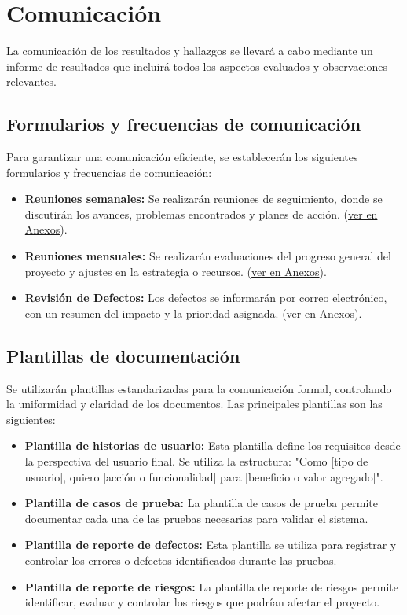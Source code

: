 \documentclass[stu, 12pt, letterpaper, donotrepeattitle, floatsintext, natbib]{apa7}
\begin{document}
\section{\large Comunicación}

\noindent La comunicación de los resultados y hallazgos se llevará a cabo mediante un informe de resultados que incluirá todos los aspectos evaluados y observaciones relevantes.

    \subsection{Formularios y frecuencias de comunicación}
        \noindent Para garantizar una comunicación eficiente, se establecerán los siguientes formularios y frecuencias de comunicación:
        \begin{itemize}
            \item \textbf{Reuniones semanales:} Se realizarán reuniones de seguimiento, donde se discutirán los avances, problemas encontrados y planes de acción. (\hyperref[]{ver en Anexos}).
            \item \textbf{Reuniones mensuales:} Se realizarán evaluaciones del progreso general del proyecto y ajustes en la estrategia o recursos. (\hyperref[]{ver en Anexos}).
            \item \textbf{Revisión de Defectos:} Los defectos se informarán por correo electrónico, con un resumen del impacto y la prioridad asignada. (\hyperref[]{ver en Anexos}).
        \end{itemize}

        \subsection{Plantillas de documentación}
            \noindent Se utilizarán plantillas estandarizadas para la comunicación formal, controlando la uniformidad y claridad de los documentos. Las principales plantillas son las siguientes:
            \begin{itemize}
                \item \textbf{Plantilla de historias de usuario:} Esta plantilla define los requisitos desde la perspectiva del usuario final. Se utiliza la estructura: "Como [tipo de usuario], quiero [acción o funcionalidad] para [beneficio o valor agregado]".
                \item \textbf{Plantilla de casos de prueba:} La plantilla de casos de prueba permite documentar cada una de las pruebas necesarias para validar el sistema.
                \item \textbf{Plantilla de reporte de defectos:} Esta plantilla se utiliza para registrar y controlar los errores o defectos identificados durante las pruebas.
                \item \textbf{Plantilla de reporte de riesgos:} La plantilla de reporte de riesgos permite identificar, evaluar y controlar los riesgos que podrían afectar el proyecto.
            \end{itemize}
\end{document}
